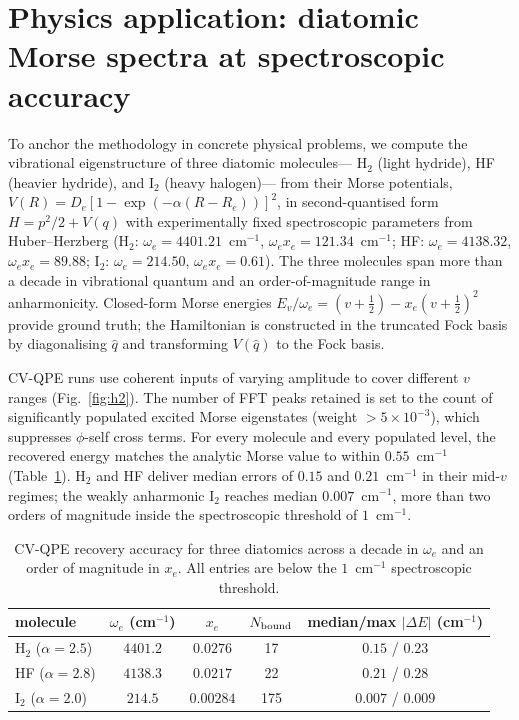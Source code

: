 \documentclass[12pt]{iopart}
\begin{document}
\section{Physics application: diatomic Morse spectra at
spectroscopic accuracy}\label{sec:h2}
To anchor the methodology in concrete physical problems, we compute the
vibrational eigenstructure of three diatomic molecules---%
H$_2$ (light hydride), HF (heavier hydride), and I$_2$ (heavy halogen)---%
from their Morse potentials,
$V(R)=D_e[1-\exp(-\alpha(R-R_e))]^2$, in second-quantised form $H=p^2/2
+ V(q)$ with experimentally fixed spectroscopic parameters from
Huber--Herzberg (H$_2$: $\omega_e=4401.21$~cm$^{-1}$,
$\omega_e x_e=121.34$~cm$^{-1}$; HF: $\omega_e=4138.32$, $\omega_e x_e
=89.88$; I$_2$: $\omega_e=214.50$, $\omega_e x_e=0.61$). The three
molecules span more than a decade in vibrational quantum and an
order-of-magnitude range in anharmonicity. Closed-form Morse energies
$E_v/\omega_e=(v+\frac12)-x_e(v+\frac12)^2$ provide ground truth; the
Hamiltonian is constructed in the truncated Fock basis by diagonalising
$\hat q$ and transforming $V(\hat q)$ to the Fock basis.

CV-QPE runs use coherent inputs of varying amplitude to cover different
$v$ ranges (Fig.~\ref{fig:h2}). The number of FFT peaks retained is set
to the count of significantly populated excited Morse eigenstates
(weight $>5\!\times\!10^{-3}$), which suppresses $\phi$-self cross terms.
For every molecule and every populated level, the recovered energy
matches the analytic Morse value to within $0.55$~cm$^{-1}$ (Table~\ref{tab:h2}).
H$_2$ and HF deliver median errors of $0.15$ and $0.21$~cm$^{-1}$ in their
mid-$v$ regimes; the weakly anharmonic I$_2$ reaches
median $0.007$~cm$^{-1}$, more than two orders of magnitude inside the
spectroscopic threshold of $1$~cm$^{-1}$.

\begin{table}[t]
\caption{CV-QPE recovery accuracy for three diatomics across a decade in
$\omega_e$ and an order of magnitude in $x_e$. All entries are below the
$1$~cm$^{-1}$ spectroscopic threshold.}
\label{tab:h2}

\begin{tabular}{lcccc}
molecule & $\omega_e$ (cm$^{-1}$) & $x_e$ & $N_{\rm bound}$ &
  median/max $|\Delta E|$ (cm$^{-1}$)\\
\hline
H$_2$ ($\alpha\!=\!2.5$) & $4401.2$ & $0.0276$ & 17 & $0.15$ / $0.23$ \\
HF ($\alpha\!=\!2.8$) & $4138.3$ & $0.0217$ & 22 & $0.21$ / $0.28$ \\
I$_2$ ($\alpha\!=\!2.0$) & $214.5$ & $0.00284$ & 175 & $0.007$ / $0.009$\\
\end{tabular}

\end{table}
\end{document}
